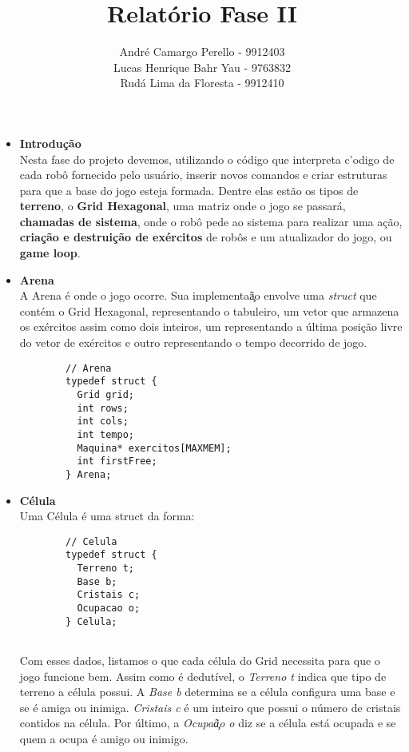 \documentclass{article}
\begin{document}
\title{Relat\'orio Fase II}
\author{Andr\'e Camargo Perello - 9912403\\Lucas Henrique Bahr Yau - 9763832\\Rud\'a Lima da Floresta - 9912410}
\date{}

\maketitle
\newpage
\begin{itemize}
    \item \textbf{Introdu\c c\~ao} \\
    Nesta fase do projeto devemos, utilizando o c\'odigo que interpreta c'odigo de cada rob\^o fornecido pelo usu\'ario, inserir novos comandos e criar estruturas para que a base do jogo esteja formada. Dentre elas est\~ao os tipos de \textbf{terreno}, o \textbf{Grid Hexagonal}, uma matriz onde o jogo se passar\'a, \textbf{chamadas de sistema}, onde o rob\^o pede ao sistema para realizar uma a\c c\~ao, \textbf{cria\c c\~ao e destrui\c c\~ao de ex\'ercitos} de rob\^os e um atualizador do jogo, ou \textbf{game loop}.
    
    \item \textbf{Arena} \\
    A Arena \'e onde o jogo ocorre. Sua implementa\c \~ao envolve uma \textit{struct} que cont\'em o Grid Hexagonal, representando o tabuleiro, um vetor que armazena os ex\'ercitos assim como dois inteiros, um representando a \'ultima posi\c c\~ao livre do vetor de ex\'ercitos e outro representando o tempo decorrido de jogo.
    \begin{lstlisting}
        // Arena
        typedef struct {
          Grid grid;
          int rows;
          int cols;
          int tempo;
          Maquina* exercitos[MAXMEM];
          int firstFree;
        } Arena;

    \end{lstlisting}
    \item \textbf{C\'elula} \\
    Uma C\'elula \'e uma struct da forma:
    \begin{lstlisting}
        // Celula
        typedef struct {
          Terreno t;
          Base b;
          Cristais c;
          Ocupacao o;
        } Celula;
    
    \end{lstlisting}
    Com esses dados, listamos o que cada c\'elula do Grid necessita para que o jogo funcione bem. Assim como \'e dedut\'ivel, o \textit{Terreno t} indica que tipo de terreno a c\'elula possui. A \textit{Base b} determina se a c\'elula configura uma base e se \'e amiga ou inimiga. \textit{Cristais c} \'e um inteiro que possui o n\'umero de cristais contidos na c\'elula. Por \'ultimo, a \textit{Ocupa\c \~ao o} diz se a c\'elula est\'a ocupada e se quem a ocupa \'e amigo ou inimigo.
    

\end{itemize}
\end{document}
